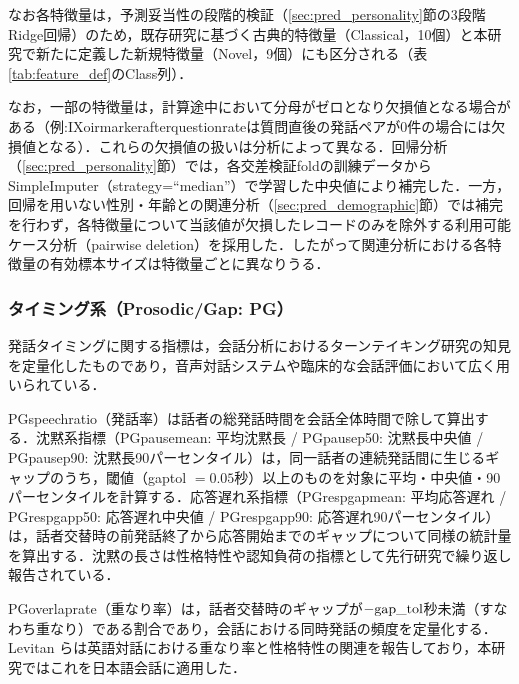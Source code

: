 \documentclass[dvipdfmx,11pt,a4paper]{bxjsarticle}
\renewcommand{\_}{\paperorigunderscore\allowbreak}%
\begin{document}
なお各特徴量は，予測妥当性の段階的検証（\ref{sec:pred_personality}節の3段階Ridge回帰）のため，既存研究に基づく古典的特徴量（Classical，10個）と本研究で新たに定義した新規特徴量（Novel，9個）にも区分される（表\ref{tab:feature_def}のClass列）．

なお，一部の特徴量は，計算途中において分母がゼロとなり欠損値となる場合がある（例:IX\_oirmarker\_after\_question\_rateは質問直後の発話ペアが0件の場合には欠損値となる）．これらの欠損値の扱いは分析によって異なる．回帰分析（\ref{sec:pred_personality}節）では，各交差検証foldの訓練データからSimpleImputer（strategy=``median''）で学習した中央値により補完した．一方，回帰を用いない性別・年齢との関連分析（\ref{sec:pred_demographic}節）では補完を行わず，各特徴量について当該値が欠損したレコードのみを除外する利用可能ケース分析（pairwise deletion）を採用した．したがって関連分析における各特徴量の有効標本サイズは特徴量ごとに異なりうる．


\subsubsection{タイミング系（Prosodic/Gap: PG）}
発話タイミングに関する指標は，会話分析におけるターンテイキング研究\cite{sacks1974}の知見を定量化したものであり，音声対話システムや臨床的な会話評価において広く用いられている\cite{levitan2012,deruiter2006}．

PG\_speech\_ratio（発話率）は話者の総発話時間を会話全体時間で除して算出する．沈黙系指標（PG\_pause\_mean: 平均沈黙長 / PG\_pause\_p50: 沈黙長中央値 / PG\_pause\_p90: 沈黙長90パーセンタイル）は，同一話者の連続発話間に生じるギャップのうち，閾値（gap\_tol $= 0.05$秒）以上のものを対象に平均・中央値・90パーセンタイルを計算する．応答遅れ系指標（PG\_resp\_gap\_mean: 平均応答遅れ / PG\_resp\_gap\_p50: 応答遅れ中央値 / PG\_resp\_gap\_p90: 応答遅れ90パーセンタイル）は，話者交替時の前発話終了から応答開始までのギャップについて同様の統計量を算出する．沈黙の長さは性格特性や認知負荷の指標として先行研究で繰り返し報告されている\cite{campione2002}．

PG\_overlap\_rate（重なり率）は，話者交替時のギャップが$-\text{gap\_tol}$秒未満（すなわち重なり）である割合であり，会話における同時発話の頻度を定量化する．Levitan ら\cite{levitan2012}は英語対話における重なり率と性格特性の関連を報告しており，本研究ではこれを日本語会話に適用した．
\end{document}
